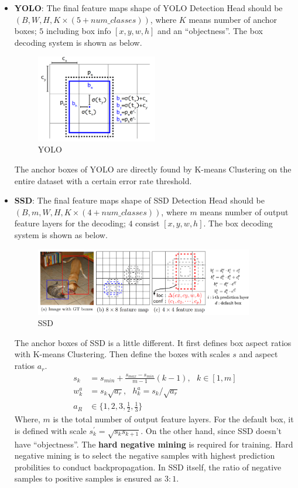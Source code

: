 \documentclass[a4paper]{article}
\begin{document}
\begin{itemize}
	\item \textbf{YOLO}: The final feature maps shape of YOLO Detection Head should be $(B, W, H, K \times (5 + num\_classes))$, where $K$ means number of anchor boxes; $5$ including box info $[x, y, w, h]$ and an ``objectness''. The box decoding system is shown as below.
	\begin{figure}[h]
		\centering
		\includegraphics[width=0.5\textwidth]{images/YOLO.png}
		\caption{YOLO}
		\label{fig:yolo}
	\end{figure}
	The anchor boxes of YOLO are directly found by K-means Clustering on the entire dataset with a certain error rate threshold.
	\item \textbf{SSD}: The final feature maps shape of SSD Detection Head should be $(B, m, W, H, K \times (4 + num\_classes))$, where $m$ means number of output feature layers for the decoding; $4$ consist $[x, y, w, h]$. The box decoding system is shown as below.
	\begin{figure}[h]
		\centering
		\includegraphics[width=0.9\textwidth]{images/SSD.png}
		\caption{SSD}
		\label{fig:ssd}
	\end{figure}
	The anchor boxes of SSD is a little different. It first defines box aspect ratios with K-means Clustering. Then define the boxes with scales $s$ and aspect ratios $a_r$. 
	\begin{align}
		s_k &= s_{min} + \frac{s_{max} - s_{min}}{m -1}(k - 1),\,\,\,\, k \in [1, m] \\
		w_k^a &= s_k \sqrt{a_r},\,\,\,\, h_k^a = s_k / \sqrt{a_r} \\
		a_R &\in \{ 1, 2, 3, \frac{1}{2}, \frac{1}{3} \}
	\end{align}
	Where, $m$ is the total number of output feature layers. For the default box, it is defined with scale $s_k^{\prime} = \sqrt{s_k s_{k+1}}$.
	On the other hand, since SSD doesn't have ``objectness''. The \textbf{hard negative mining} is required for training. Hard negative mining is to select the negative samples with highest prediction probilities to conduct backpropagation. In SSD itself, the ratio of negative samples to positive samples is ensured as $3:1$.
\end{itemize}
\end{document}
